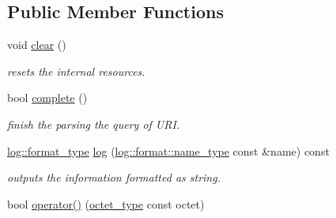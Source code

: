 \subsection*{Public Member Functions}
\begin{DoxyCompactItemize}
\item 
\hypertarget{classhryky_1_1uri_1_1query_1_1_reader_a78e5767cfa30a186a897beb8eed44629}{void \hyperlink{classhryky_1_1uri_1_1query_1_1_reader_a78e5767cfa30a186a897beb8eed44629}{clear} ()}\label{classhryky_1_1uri_1_1query_1_1_reader_a78e5767cfa30a186a897beb8eed44629}

\begin{DoxyCompactList}\small\item\em resets the internal resources. \end{DoxyCompactList}\item 
\hypertarget{classhryky_1_1uri_1_1query_1_1_reader_a0f3de6ac07e2a0b3e820712b3a3a8822}{bool \hyperlink{classhryky_1_1uri_1_1query_1_1_reader_a0f3de6ac07e2a0b3e820712b3a3a8822}{complete} ()}\label{classhryky_1_1uri_1_1query_1_1_reader_a0f3de6ac07e2a0b3e820712b3a3a8822}

\begin{DoxyCompactList}\small\item\em finish the parsing the query of U\-R\-I. \end{DoxyCompactList}\item 
\hypertarget{classhryky_1_1uri_1_1query_1_1_reader_a6b6d0492fe9e749fc7e74c16c57994a2}{\hyperlink{namespacehryky_1_1log_ad50448c3f934f1eacd5c1bcffe8111e1}{log\-::format\-\_\-type} \hyperlink{classhryky_1_1uri_1_1query_1_1_reader_a6b6d0492fe9e749fc7e74c16c57994a2}{log} (\hyperlink{namespacehryky_1_1log_1_1format_ab7408d1e2ed2d648dbf9bba69eb74288}{log\-::format\-::name\-\_\-type} const \&name) const }\label{classhryky_1_1uri_1_1query_1_1_reader_a6b6d0492fe9e749fc7e74c16c57994a2}

\begin{DoxyCompactList}\small\item\em outputs the information formatted as string. \end{DoxyCompactList}\item 
\hypertarget{classhryky_1_1uri_1_1query_1_1_reader_a1dcdf661d52e4659a65dbb9207799771}{bool \hyperlink{classhryky_1_1uri_1_1query_1_1_reader_a1dcdf661d52e4659a65dbb9207799771}{operator()} (\hyperlink{namespacehryky_a488cba8b666be33ccca70e819684e3c8}{octet\-\_\-type} const octet)}\label{classhryky_1_1uri_1_1query_1_1_reader_a1dcdf661d52e4659a65dbb9207799771}


\end{DoxyCompactItemize}
